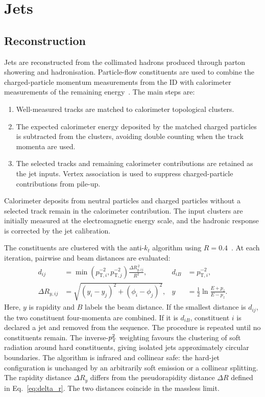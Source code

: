 \section{Jets}
\label{sec:ch6_jets}

\subsection{Reconstruction}

Jets are reconstructed from the collimated hadrons produced through parton showering and hadronisation.
Particle-flow constituents are used to combine the charged-particle momentum measurements from the ID with calorimeter measurements of the remaining energy~\cite{ATLAS2017ParticleFlow}.
The main steps are:
\begin{enumerate}
    \item Well-measured tracks are matched to calorimeter topological clusters.
    \item The expected calorimeter energy deposited by the matched charged particles is subtracted from the clusters, avoiding double counting when the track momenta are used.
    \item The selected tracks and remaining calorimeter contributions are retained as the jet inputs. Vertex association is used to suppress charged-particle contributions from pile-up.
\end{enumerate}
Calorimeter deposits from neutral particles and charged particles without a selected track remain in the calorimeter contribution.
The input clusters are initially measured at the electromagnetic energy scale, and the hadronic response is corrected by the jet calibration.

The constituents are clustered with the anti-$k_t$ algorithm using $R=0.4$~\cite{Cacciari2008AntiKt}.
At each iteration, pairwise and beam distances are evaluated:
\begin{align}
    d_{ij}&=\min\!\left(p_{\mathrm{T},i}^{-2},p_{\mathrm{T},j}^{-2}\right)
       \frac{\Delta R_{y,ij}^{\,2}}{R^2},
    &d_{iB}&=p_{\mathrm{T},i}^{-2},
    \label{eq:ch6_antikt}\\
    \Delta R_{y,ij}&=\sqrt{(y_i-y_j)^2+(\phi_i-\phi_j)^2},
    &y&=\frac{1}{2}\ln\frac{E+p_z}{E-p_z}.
    \label{eq:ch6_rapidity}
\end{align}
Here, $y$ is rapidity and $B$ labels the beam distance.
If the smallest distance is $d_{ij}$, the two constituent four-momenta are combined.
If it is $d_{iB}$, constituent $i$ is declared a jet and removed from the sequence.
The procedure is repeated until no constituents remain.
The inverse-$p_{\mathrm{T}}^2$ weighting favours the clustering of soft radiation around hard constituents, giving isolated jets approximately circular boundaries.
The algorithm is infrared and collinear safe: the hard-jet configuration is unchanged by an arbitrarily soft emission or a collinear splitting.
The rapidity distance $\Delta R_y$ differs from the pseudorapidity distance $\Delta R$ defined in Eq.~\eqref{eq:delta_r}.
The two distances coincide in the massless limit.

